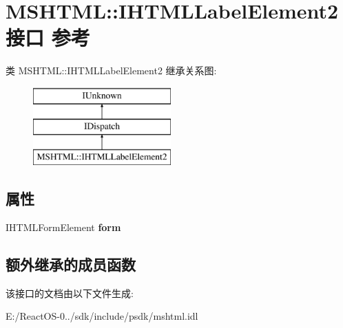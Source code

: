 \hypertarget{interface_m_s_h_t_m_l_1_1_i_h_t_m_l_label_element2}{}\section{M\+S\+H\+T\+ML\+:\+:I\+H\+T\+M\+L\+Label\+Element2接口 参考}
\label{interface_m_s_h_t_m_l_1_1_i_h_t_m_l_label_element2}
类 M\+S\+H\+T\+ML\+:\+:I\+H\+T\+M\+L\+Label\+Element2 继承关系图\+:\begin{figure}[H]
\begin{center}
\leavevmode
\includegraphics[height=3.000000cm]{interface_m_s_h_t_m_l_1_1_i_h_t_m_l_label_element2}
\end{center}
\end{figure}
\subsection*{属性}
\begin{DoxyCompactItemize}
\item 
\mbox{\label{interface_m_s_h_t_m_l_1_1_i_h_t_m_l_label_element2_ac86425adb2473f19d38835ffee6ca162}} 
I\+H\+T\+M\+L\+Form\+Element {\bfseries form}
\end{DoxyCompactItemize}
\subsection*{额外继承的成员函数}


该接口的文档由以下文件生成\+:\begin{DoxyCompactItemize}
\item 
E\+:/\+React\+O\+S-\/0../sdk/include/psdk/mshtml.\+idl\end{DoxyCompactItemize}
